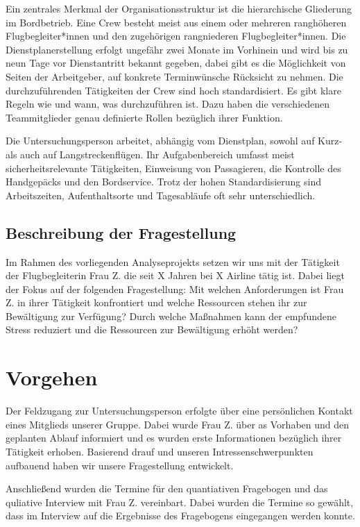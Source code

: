 \documentclass[12pt, a4paper]{article}
\begin{document}
Ein zentrales Merkmal der Organisationsstruktur ist die hierarchische Gliederung im Bordbetrieb.
Eine Crew besteht meist aus einem oder mehreren ranghöheren Flugbegleiter*innen und den zugehörigen rangniederen Flugbegleiter*innen.
Die Dienstplanerstellung erfolgt ungefähr zwei Monate im Vorhinein und wird bis zu neun Tage vor Dienstantritt bekannt gegeben, 
dabei gibt es die Möglichkeit von Seiten der Arbeitgeber, auf konkrete Terminwünsche Rücksicht zu nehmen.
Die durchzuführenden Tätigkeiten der Crew sind hoch standardisiert. Es gibt klare Regeln wie und wann, was durchzuführen ist. 
Dazu haben die verschiedenen Teammitglieder genau definierte Rollen bezüglich ihrer Funktion.

Die Untersuchungsperson arbeitet, abhängig vom Dienstplan, sowohl auf Kurz- als auch auf Langstreckenflügen. 
Ihr Aufgabenbereich umfasst meist sicherheitsrelevante Tätigkeiten,
Einweisung von Passagieren, die Kontrolle des Handgepäcks und den Bordservice.
Trotz der hohen Standardisierung sind Arbeitszeiten, Aufenthaltsorte und Tagesabläufe oft sehr unterschiedlich.



\subsection{Beschreibung der Fragestellung}
Im Rahmen des vorliegenden Analyseprojekts setzen wir uns mit der Tätigkeit der Flugbegleiterin 
Frau Z. die seit X Jahren bei X Airline tätig ist. Dabei liegt der Fokus auf der folgenden 
Fragestellung:
Mit welchen Anforderungen ist Frau Z. in ihrer Tätigkeit konfrontiert und
welche Ressourcen stehen ihr zur Bewältigung zur Verfügung? Durch welche Maßnahmen kann der empfundene 
Stress reduziert und die Ressourcen zur Bewältigung erhöht werden? 

\section{Vorgehen}

Der Feldzugang zur Untersuchungsperson erfolgte über eine persönlichen Kontakt eines Mitglieds 
unserer Gruppe. Dabei wurde Frau Z. über as Vorhaben und den geplanten Ablauf informiert und 
es wurden erste Informationen bezüglich ihrer Tätigkeit erhoben. Basierend drauf und 
unseren Intressenschwerpunkten aufbauend haben wir unsere Fragestellung entwickelt. 

Anschließend wurden die Termine für den quantiativen Fragebogen und das quliative Interview 
mit Frau Z. vereinbart. Dabei wurden die Termine so gewählt, dass im Interview auf die Ergebnisse 
des Fragebogens eingegangen werden konnte. 
\end{document}
